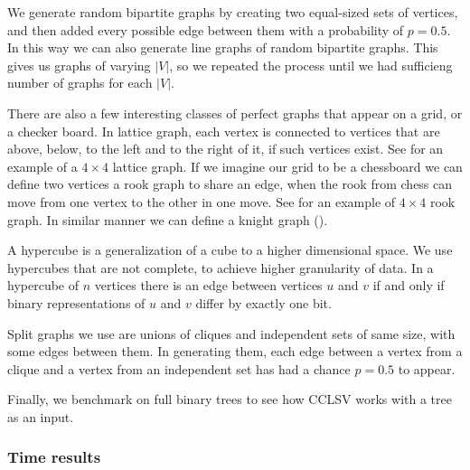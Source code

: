 
We generate random bipartite graphs by creating two equal-sized sets of vertices, and then added every possible edge between them with a probability of $p = 0.5$. In this way we can also generate line graphs of random bipartite graphs. This gives us graphs of varying $|V|$, so we repeated the process until we had sufficieng number of graphs for each $|V|$.

There are also a few interesting classes of perfect graphs that appear on a grid, or a checker board. In lattice graph, each vertex is connected to vertices that are above, below, to the left and to the right of it, if such vertices exist. See  for an example of a $4 \times 4$ lattice graph. If we imagine our grid to be a chessboard we can define two vertices a rook graph to share an edge, when the rook from chess can move from one vertex to the other in one move. See  for an example of $4 \times 4$ rook graph. In similar manner we can define a knight graph ().

A hypercube is a generalization of a cube to a higher dimensional space. We use hypercubes that are not complete, to achieve higher granularity of data. In a hypercube of $n$ vertices there is an edge between vertices $u$ and $v$ if and only if binary representations of $u$ and $v$ differ by exactly one bit.

Split graphs we use are unions of cliques and independent sets of same size, with some edges between them. In generating them, each edge between a vertex from a clique and a vertex from an independent set has had a chance $p = 0.5$ to appear.

Finally, we benchmark on full binary trees to see how CCLSV works with a tree as an input.

\subsubsection{Time results}

